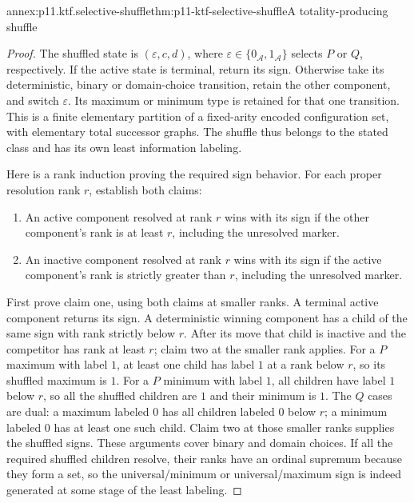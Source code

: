 \begin{annexitem}{annex:p11.ktf.selective-shuffle}{thm:p11-ktf-selective-shuffle}{A totality-producing shuffle}
\begin{proof}
The shuffled state is \((\varepsilon,c,d)\), where
\(\varepsilon\in\{0_{\mathcal A},1_{\mathcal A}\}\)
selects \(P\) or \(Q\), respectively. If the active state
is terminal, return its sign. Otherwise take its deterministic,
binary or domain-choice transition, retain the other component,
and switch \(\varepsilon\). Its maximum or minimum type
is retained for that one transition. This is a finite elementary
partition of a fixed-arity encoded configuration set, with elementary
total successor graphs. The shuffle thus belongs to the stated
class and has its own least information labeling.

Here is a rank induction proving the required sign behavior. For
each proper resolution rank \(r\), establish both claims:

\begin{enumerate}
\item An active component resolved at rank \(r\) wins with
its sign if the other component's rank is at least \(r\),
including the unresolved marker.
\item An inactive component resolved at rank \(r\) wins with
its sign if the active component's rank is strictly greater than
\(r\), including the unresolved marker.
\end{enumerate}

First prove claim one, using both claims at smaller ranks. A terminal
active component returns its sign. A deterministic winning component
has a child of the same sign with rank strictly below \(r\).
After its move that child is inactive and the competitor has rank
at least \(r\); claim two at the smaller rank applies. For
a \(P\) maximum with label \(1\), at least one child
has label \(1\) at a rank below \(r\), so its shuffled
maximum is \(1\). For a \(P\) minimum with label \(1\),
all children have label \(1\) below \(r\), so all the
shuffled children are \(1\) and their minimum is \(1\).
The \(Q\) cases are dual: a maximum labeled \(0\) has
all children labeled \(0\) below \(r\); a minimum labeled
\(0\) has at least one such child. Claim two at those smaller
ranks supplies the shuffled signs. These arguments cover binary
and domain choices. If all the required shuffled children resolve,
their ranks have an ordinal supremum because they form a set,
so the universal/minimum or universal/maximum sign is indeed generated
at some stage of the least labeling.


\end{proof}
\end{annexitem}
